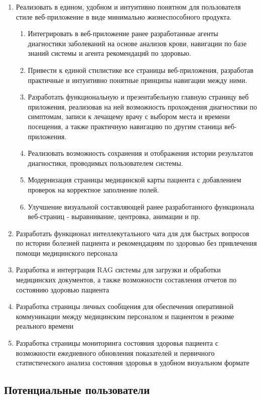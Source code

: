 \begin{enumerate}[label=\arabic*)]
    \item Реализовать в едином, удобном и интуитивно понятном для пользователя стиле веб-приложение в виде минимально жизнеспособного продукта.
        \begin{enumerate}[label=\alph*)]
            \item Интегрировать в веб-приложение ранее разработанные агенты диагностики заболеваний на основе анализов крови, навигации по базе знаний системы и агента рекомендаций по здоровью.
            \item Привести к единой стилистике все страницы веб-приложения, разработав практичные и интуитивно понятные принципы навигации между ними.
            \item Разработать функциональную и презентабельную главную страницу веб приложения, реализовав на ней возможность прохождения диагностики по симптомам, записи к лечащему врачу с выбором места и времени посещения, а также практичную навигацию по другим станица веб-приложения.
            \item Реализовать возможность сохранения и отображения истории результатов диагностики, проводимых пользователем системы.
            \item Модернизация страницы медицинской карты пациента с добавлением проверок на корректное заполнение полей.
	 \item Улучшение визуальной составляющей ранее разработанного функционала веб-страниц - выравнивание, центровка, анимации и пр.
        \end{enumerate}
   \item Разработать функционал интеллекутального чата для для быстрых вопросов по истории болезней пациента и рекомендациям по здоровью без привлечения помощи медицинского персонала
    \item Разработка и интерграция RAG системы для загрузки и обработки медицинских документов, а также возможности составления отчетов по состоянию здоровью пациента
    \item Разработка страницы личных сообщения для обеспечения оперативной коммуникации между медицинским персоналом и пациентом в режиме реального времени
    \item Разработка страницы мониторинга состояния здоровья пациента с возможности ежедневного обновления показателей и первичного статистического анализа состояния здоровья в удобном визуальном формате
    
\end{enumerate}

\subsection{Потенциальные пользователи}

